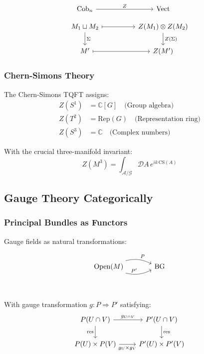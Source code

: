 \[
\begin{tikzcd}[row sep=small]
\text{Cob}_n \arrow[rr, "Z"] & & \text{Vect} \\
M_1 \sqcup M_2 \arrow[dd, "\Sigma"] \arrow[rr, mapsto] & & 
Z(M_1) \otimes Z(M_2) \arrow[dd, "Z(\Sigma)"] \\
& & \\
M' \arrow[rr, mapsto] & & Z(M')
\end{tikzcd}
\]

\subsubsection{Chern-Simons Theory}

The Chern-Simons TQFT assigns:
\begin{align}
Z(S^1) &= \mathbb{C}[G] \quad \text{(Group algebra)} \\
Z(T^2) &= \text{Rep}(G) \quad \text{(Representation ring)} \\
Z(S^3) &= \mathbb{C} \quad \text{(Complex numbers)}
\end{align}

With the crucial three-manifold invariant:
\[
Z(M^3) = \int_{\mathcal{A}/\mathcal{G}} \mathcal{D}A \, e^{ik\,\text{CS}(A)}
\]

\subsection{Gauge Theory Categorically}

\subsubsection{Principal Bundles as Functors}

Gauge fields as natural transformations:

\[
\begin{tikzcd}[row sep=large, column sep=large]
\text{Open}(M) \arrow[r, "P", bend left=20] \arrow[r, "P'", bend right=20] & 
\text{BG} \\
\end{tikzcd}
\]

With gauge transformation $g: P \Rightarrow P'$ satisfying:
\[
\begin{tikzcd}
P(U \cap V) \arrow[r, "g_{U \cap V}"] \arrow[d, "\text{res}"'] & 
P'(U \cap V) \arrow[d, "\text{res}"] \\
P(U) \times P(V) \arrow[r, "g_U \times g_V"'] & 
P'(U) \times P'(V)
\end{tikzcd}
\]

